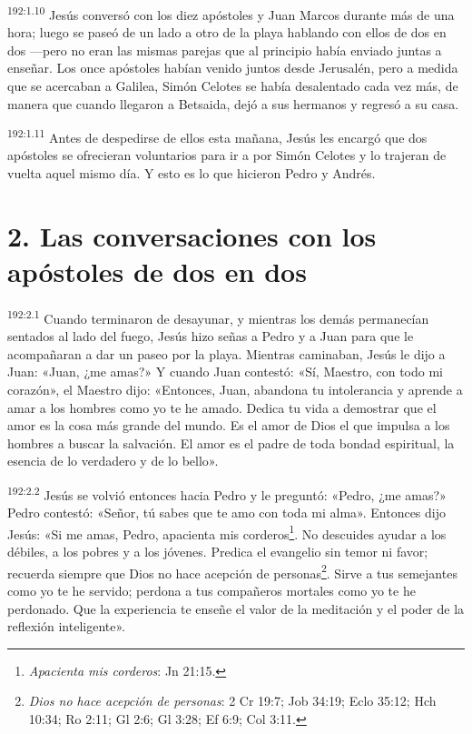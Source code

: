 \par
\textsuperscript{192:1.10} Jesús conversó con los diez apóstoles y Juan Marcos durante más de una hora; luego se paseó de un lado a otro de la playa hablando con ellos de dos en dos ---pero no eran las mismas parejas que al principio había enviado juntas a enseñar. Los once apóstoles habían venido juntos desde Jerusalén, pero a medida que se acercaban a Galilea, Simón Celotes se había desalentado cada vez más, de manera que cuando llegaron a Betsaida, dejó a sus hermanos y regresó a su casa.

\par
\textsuperscript{192:1.11} Antes de despedirse de ellos esta mañana, Jesús les encargó que dos apóstoles se ofrecieran voluntarios para ir a por Simón Celotes y lo trajeran de vuelta aquel mismo día. Y esto es lo que hicieron Pedro y Andrés.

\section*{2. Las conversaciones con los apóstoles de dos en dos}
\par
\textsuperscript{192:2.1} Cuando terminaron de desayunar, y mientras los demás permanecían sentados al lado del fuego, Jesús hizo señas a Pedro y a Juan para que le acompañaran a dar un paseo por la playa. Mientras caminaban, Jesús le dijo a Juan: «Juan, ¿me amas?» Y cuando Juan contestó: «Sí, Maestro, con todo mi corazón», el Maestro dijo: «Entonces, Juan, abandona tu intolerancia y aprende a amar a los hombres como yo te he amado. Dedica tu vida a demostrar que el amor es la cosa más grande del mundo. Es el amor de Dios el que impulsa a los hombres a buscar la salvación. El amor es el padre de toda bondad espiritual, la esencia de lo verdadero y de lo bello».

\par
\textsuperscript{192:2.2} Jesús se volvió entonces hacia Pedro y le preguntó: «Pedro, ¿me amas?» Pedro contestó: «Señor, tú sabes que te amo con toda mi alma». Entonces dijo Jesús: «Si me amas, Pedro, apacienta mis corderos\footnote{\textit{Apacienta mis corderos}: Jn 21:15.}. No descuides ayudar a los débiles, a los pobres y a los jóvenes. Predica el evangelio sin temor ni favor; recuerda siempre que Dios no hace acepción de personas\footnote{\textit{Dios no hace acepción de personas}: 2 Cr 19:7; Job 34:19; Eclo 35:12; Hch 10:34; Ro 2:11; Gl 2:6; Gl 3:28; Ef 6:9; Col 3:11.}. Sirve a tus semejantes como yo te he servido; perdona a tus compañeros mortales como yo te he perdonado. Que la experiencia te enseñe el valor de la meditación y el poder de la reflexión inteligente».

